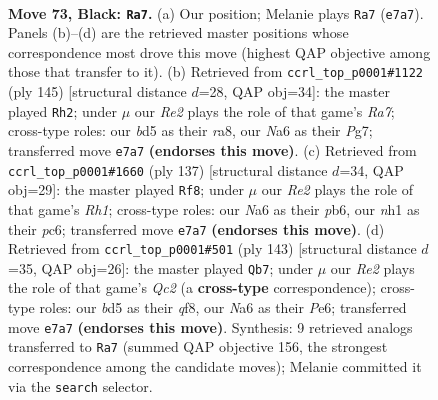 \documentclass[11pt]{article}
\begin{document}
\clearpage

\begin{figure}[p]\centering
\begin{subfigure}{0.46\textwidth}\centering
\resizebox{\linewidth}{!}{%
\newchessgame
\chessboard[
  setfen={8/4rp2/n5p1/3BP2p/b4Pp1/3k4/5K1P/7N b - - 5 73},
  showmover=false,
  pgfstyle=straightmove, color=movearrow, markmove={e7-a7}
]}
\caption{}
\end{subfigure}\hfill
\begin{subfigure}{0.46\textwidth}\centering
\resizebox{\linewidth}{!}{%
\newchessgame
\chessboard[
  setfen={R7/6pk/pB3p2/Pp3P1p/7P/8/r7/3K4 b - - 8 73},
  showmover=false,
  pgfstyle=straightmove, color=movearrow, markmove={a2-h2}
]}
\caption{}
\end{subfigure}
\\[4pt]
\begin{subfigure}{0.46\textwidth}\centering
\resizebox{\linewidth}{!}{%
\newchessgame
\chessboard[
  setfen={2k4r/8/1PP3p1/p2p1p2/3P1PpP/3B4/8/6K1 b - - 16 69},
  showmover=false,
  pgfstyle=straightmove, color=movearrow, markmove={h8-f8}
]}
\caption{}
\end{subfigure}\hfill
\begin{subfigure}{0.46\textwidth}\centering
\resizebox{\linewidth}{!}{%
\newchessgame
\chessboard[
  setfen={5Q2/2q2p1k/4p1p1/4P2p/8/3K2P1/1p5P/1B6 b - - 17 72},
  showmover=false,
  pgfstyle=straightmove, color=movearrow, markmove={c7-b7}
]}
\caption{}
\end{subfigure}
\caption{\textbf{Move 73, Black: \texttt{Ra7}.} (a) Our position; Melanie plays \texttt{Ra7} (\texttt{e7a7}). Panels (b)--(d) are the retrieved master positions whose correspondence most drove this move (highest QAP objective among those that transfer to it). (b) Retrieved from \texttt{ccrl\_top\_p0001\#1122} (ply 145) [structural distance $d$=28, QAP obj=34]: the master played \texttt{Rh2}; under $\mu$ our \emph{Re2} plays the role of that game's \emph{Ra7}; cross-type roles: our \emph{b}d5 as their \emph{r}a8, our \emph{N}a6 as their \emph{P}g7; transferred move \texttt{e7a7} \textbf{(endorses this move)}. (c) Retrieved from \texttt{ccrl\_top\_p0001\#1660} (ply 137) [structural distance $d$=34, QAP obj=29]: the master played \texttt{Rf8}; under $\mu$ our \emph{Re2} plays the role of that game's \emph{Rh1}; cross-type roles: our \emph{N}a6 as their \emph{p}b6, our \emph{n}h1 as their \emph{p}c6; transferred move \texttt{e7a7} \textbf{(endorses this move)}. (d) Retrieved from \texttt{ccrl\_top\_p0001\#501} (ply 143) [structural distance $d$=35, QAP obj=26]: the master played \texttt{Qb7}; under $\mu$ our \emph{Re2} plays the role of that game's \emph{Qc2} (a \textbf{cross-type} correspondence); cross-type roles: our \emph{b}d5 as their \emph{q}f8, our \emph{N}a6 as their \emph{P}e6; transferred move \texttt{e7a7} \textbf{(endorses this move)}. Synthesis: 9 retrieved analogs transferred to \texttt{Ra7} (summed QAP objective 156, the strongest correspondence among the candidate moves); Melanie committed it via the \texttt{search} selector.}
\label{fig:thought-m145}
\end{figure}
\end{document}
